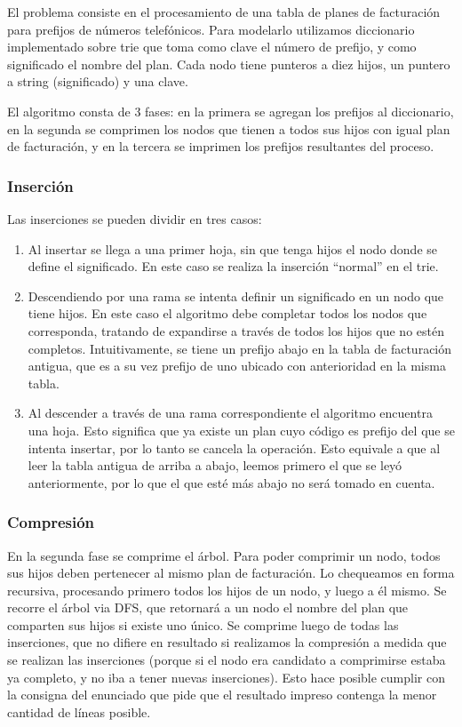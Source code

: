 El problema consiste en el procesamiento de una tabla de planes de facturación
para prefijos de números telefónicos. Para modelarlo utilizamos diccionario
implementado sobre trie que toma como clave el número de prefijo, y como
significado el nombre del plan. Cada nodo tiene punteros a diez hijos, un
puntero a string (significado) y una clave.

El algoritmo consta de 3 fases: en la primera se agregan los prefijos al
diccionario, en la segunda se comprimen los nodos que tienen a todos sus hijos
con igual plan de facturación, y en la tercera se imprimen los prefijos
resultantes del proceso.

\subsubsection*{Inserción}

Las inserciones se pueden dividir en tres casos:

\begin{enumerate}
  \item Al insertar se llega a una primer hoja, sin que tenga hijos el nodo
  donde se define el significado. En este caso se realiza la inserción ``normal''
  en el trie.

  \item Descendiendo por una rama se intenta definir un significado en un nodo
  que tiene hijos. En este caso el algoritmo debe completar todos los nodos que
  corresponda, tratando de expandirse a través de todos los hijos que no
  estén completos. Intuitivamente, se tiene un prefijo abajo en la tabla de facturación
  antigua, que es a su vez prefijo de uno ubicado con anterioridad en la misma tabla.

  \item Al descender a través de una rama correspondiente el algoritmo encuentra
  una hoja. Esto significa que ya existe un plan cuyo código es prefijo del
  que se intenta insertar, por lo tanto se cancela la operación. Esto equivale a
  que al leer la tabla antigua de arriba a abajo, leemos primero el que se leyó
  anteriormente, por lo que el que esté más abajo no será tomado en cuenta.
\end{enumerate}

\subsubsection*{Compresión}

En la segunda fase se comprime el árbol. Para poder comprimir un nodo, todos
sus hijos deben pertenecer al mismo plan de facturación. Lo chequeamos en
forma recursiva, procesando primero todos los hijos de un nodo, y luego a
él mismo. Se recorre el árbol via DFS, que retornará a un nodo el nombre
del plan que comparten sus hijos si existe uno único. Se comprime luego de
todas las inserciones, que no difiere en resultado si realizamos la compresión
a medida que se realizan las inserciones (porque si el nodo era candidato a
comprimirse estaba ya completo, y no iba a tener nuevas inserciones).
Esto hace posible cumplir con la consigna del enunciado que pide que el resultado
impreso contenga la menor cantidad de líneas posible.

